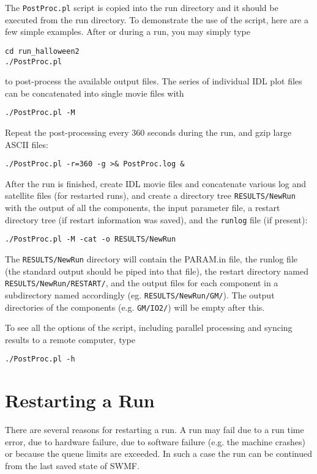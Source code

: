 The {\tt PostProc.pl} script is copied into the run directory and it should
be executed from the run directory.
To demonstrate the use of the script, here are a few simple examples.
After or during a run, you may simply type
\begin{verbatim}
cd run_halloween2
./PostProc.pl
\end{verbatim}
to post-process the available output files. The series of individual 
IDL plot files can be concatenated into single movie files with
\begin{verbatim}
./PostProc.pl -M
\end{verbatim}
Repeat the post-processing every 360 seconds during the run,
and gzip large ASCII files:
\begin{verbatim}
./PostProc.pl -r=360 -g >& PostProc.log &
\end{verbatim}
After the run is finished, create IDL movie files and concatenate
various log and satellite files (for restarted runs),
and create a directory tree {\tt RESULTS/NewRun} with the output
of all the components, the input parameter file, 
a restart directory tree (if restart information was saved), 
and the {\tt runlog} file (if present):
\begin{verbatim}
./PostProc.pl -M -cat -o RESULTS/NewRun
\end{verbatim}
The {\tt RESULTS/NewRun} directory will contain the PARAM.in file, the
runlog file (the standard output should be piped into that file),
the restart directory named {\tt RESULTS/NewRun/RESTART/},
and the output files for each component in a subdirectory named
accordingly (eg. {\tt RESULTS/NewRun/GM/}). The output directories of
the components (e.g. {\tt GM/IO2/}) will be empty after this.

To see all the options of the script, including parallel processing and
syncing results to a remote computer, type
\begin{verbatim}
./PostProc.pl -h
\end{verbatim}

\section{Restarting a Run}

There are several reasons for restarting a run. A run may fail
due to a run time error, due to hardware failure, due to 
software failure (e.g. the machine crashes) or because the
queue limits are exceeded. In such a case the run can be continued from
the last saved state of SWMF. 

